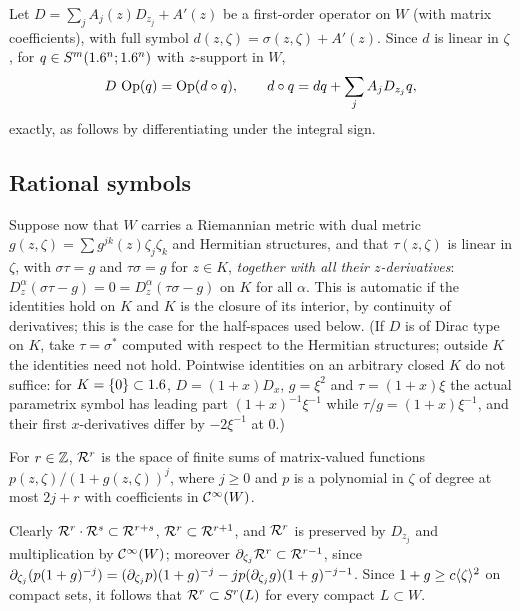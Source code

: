 Let $D=\sum_jA_j(z)D_{z_j}+A'(z)$ be a first-order operator on $W$ (with matrix
coefficients), with full symbol $d(z,\zeta)=\sigma(z,\zeta)+A'(z)$. Since $d$ is
linear in $\zeta$, for $q\in S^m(1.6^n;1.6^n)$ with $z$-support in $W$,
\begin{equation}\label{boundary:eq:comp-diff}
D\,\operatorname{Op}(q)=\operatorname{Op}(d\circ q),\qquad d\circ q=dq+\sum_jA_jD_{z_j}q,
\end{equation}
exactly, as follows by differentiating under the integral sign.

\subsection*{Rational symbols}
Suppose now that $W$ carries a Riemannian metric with dual metric $g(z,\zeta)=
\sum g^{jk}(z)\zeta_j\zeta_k$ and Hermitian structures, and that $\tau(z,\zeta)$ is
linear in $\zeta$, with $\sigma\tau=g$ and $\tau\sigma=g$ for $z\in K$, \emph{together
with all their $z$-derivatives}: $D_z^\alpha(\sigma\tau-g)=0=D_z^\alpha(\tau\sigma-g)$ on
$K$ for all $\alpha$. This is automatic if the identities hold on $K$ and $K$ is the
closure of its interior, by continuity of derivatives; this is the case for the
half-spaces used below. (If $D$ is of Dirac type on $K$, take $\tau=\sigma^*$ computed
with respect to the Hermitian structures; outside $K$ the identities need not hold.
Pointwise identities on an arbitrary closed $K$ do not suffice: for $K=\{0\}\subset1.6$,
$D=(1+x)D_x$, $g=\xi^2$ and $\tau=(1+x)\xi$ the actual parametrix symbol has leading
part $(1+x)^{-1}\xi^{-1}$ while $\tau/g=(1+x)\xi^{-1}$, and their first $x$-derivatives
differ by $-2\xi^{-1}$ at $0$.)

\begin{definition}
For $r\in\mathbb{Z}$, $\mathcal{R}^{r}$ is the space of finite sums of matrix-valued functions
$p(z,\zeta)/(1+g(z,\zeta))^j$, where $j\ge0$ and $p$ is a polynomial in $\zeta$ of
degree at most $2j+r$ with coefficients in $\mathcal{C}^\infty(W)$.
\end{definition}

Clearly $\mathcal{R}^{r}\cdot\mathcal{R}^{s}\subset\mathcal{R}^{r+s}$, $\mathcal{R}^{r}\subset\mathcal{R}^{r+1}$, and
$\mathcal{R}^{r}$ is preserved by $D_{z_j}$ and multiplication by $\mathcal{C}^\infty(W)$; moreover
$\partial_{\zeta_j}\mathcal{R}^{r}\subset\mathcal{R}^{r-1}$, since $\partial_{\zeta_j}(p(1+g)^{-j})=
(\partial_{\zeta_j}p)(1+g)^{-j}-jp(\partial_{\zeta_j}g)(1+g)^{-j-1}$. Since $1+g\ge c\langle \zeta\rangle^2$
on compact sets, it follows that $\mathcal{R}^{r}\subset S^r(L)$ for every compact $L\subset W$.


